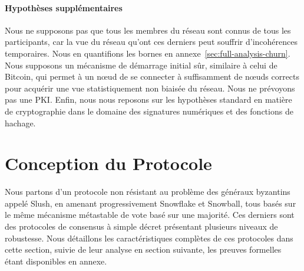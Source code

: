 \documentclass[a4,twocolumn,10pt]{article}
\newcommand{\editinsert}[1]{{\color{blue}#1}}
\theoremstyle{definition}
\begin{document}
\paragraph{Hypothèses supplémentaires}
Nous ne supposons pas que tous les membres du réseau sont connus de tous les participants, car la vue du réseau qu'ont ces derniers peut souffrir d'incohérences temporaires.
Nous en quantifions les bornes en annexe~\ref{sec:full-analysis-churn}.
Nous supposons un mécanisme de démarrage initial sûr, similaire à celui de Bitcoin, qui permet à un nœud de se connecter à suffisamment de nœuds corrects pour acquérir une vue statistiquement non biaisée du réseau.
Nous ne prévoyons pas une PKI\@.
Enfin, nous nous reposons sur les hypothèses standard en matière de cryptographie dans le domaine des signatures numériques et des fonctions de hachage.


\section{Conception du Protocole}\label{sec:protocol}
Nous partons d'un protocole non résistant au problème des généraux byzantins appelé Slush, en amenant
progressivement Snowflake et Snowball, tous basés sur le même mécanisme métastable de vote basé sur une majorité.
Ces derniers sont des protocoles de consensus à simple décret présentant plusieurs niveaux de robustesse. Nous
détaillons les caractéristiques complètes de ces protocoles dans cette section, suivie de leur analyse en section
suivante, les preuves formelles étant disponibles en annexe.

\end{document}
